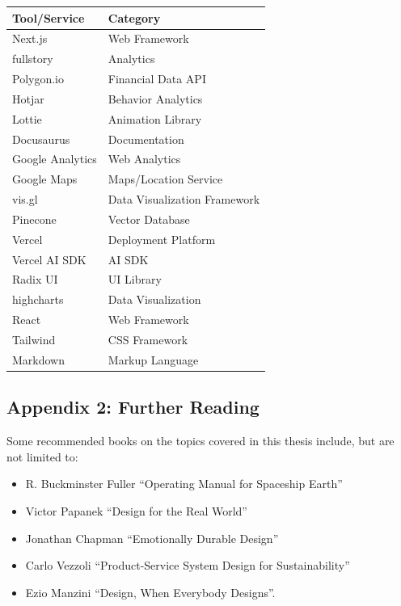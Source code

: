 \documentclass[
  12pt,
  letterpaper,
  DIV=11,
  numbers=noendperiod]{scrartcl}
\providecommand{\tightlist}{%
  \setlength{\itemsep}{0pt}\setlength{\parskip}{0pt}}
\begin{document}
\begin{longtable}[]{@{}ll@{}}
\toprule\noalign{}
Tool/Service & Category \\
\midrule\noalign{}
\endhead
\bottomrule\noalign{}
\endlastfoot
Next.js & Web Framework \\
fullstory & Analytics \\
Polygon.io & Financial Data API \\
Hotjar & Behavior Analytics \\
Lottie & Animation Library \\
Docusaurus & Documentation \\
Google Analytics & Web Analytics \\
Google Maps & Maps/Location Service \\
vis.gl & Data Visualization Framework \\
Pinecone & Vector Database \\
Vercel & Deployment Platform \\
Vercel AI SDK & AI SDK \\
Radix UI & UI Library \\
highcharts & Data Visualization \\
React & Web Framework \\
Tailwind & CSS Framework \\
Markdown & Markup Language \\
\end{longtable}

\subsection{Appendix 2: Further
Reading}\label{appendix-2-further-reading}

Some recommended books on the topics covered in this thesis include, but
are not limited to:

\begin{itemize}
\tightlist
\item
  R. Buckminster Fuller ``Operating Manual for Spaceship Earth''
\item
  Victor Papanek ``Design for the Real World''
\item
  Jonathan Chapman ``Emotionally Durable Design''
\item
  Carlo Vezzoli ``Product-Service System Design for Sustainability''
\item
  Ezio Manzini ``Design, When Everybody Designs''.
\end{itemize}

\newpage
\end{document}
